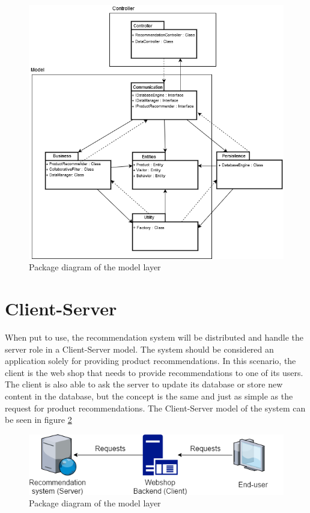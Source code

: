 \begin{figure}[H]
	\centering
	\includegraphics[width=.8\linewidth]{Figures/PackageDiagram.png}
	\caption{Package diagram of the model layer}
	\label{fig:PackageDiagram}
\end{figure}

\section{Client-Server}
When put to use, the recommendation system will be distributed and handle the server role in a Client-Server model. The system should be considered an application solely for providing product recommendations. In this scenario, the client is the web shop that needs to provide recommendations to one of its users. The client is also able to ask the server to update its database or store new content in the database, but the concept is the same and just as simple as the request for product recommendations. The Client-Server model of the system can be seen in figure \ref{fig:ClientServer}

\begin{figure}[H]
	\centering
	\includegraphics[width=.8\linewidth]{Figures/ClientServer.png}
	\caption{Package diagram of the model layer}
	\label{fig:ClientServer}
\end{figure}

